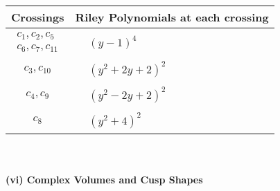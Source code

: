 \documentclass[1p]{elsarticle_modified}
\theoremstyle{definition}
\begin{document}
\begin{tabular}{m{50pt}|m{274pt}}
Crossings & \hspace{64pt}Riley Polynomials at each crossing \\
\hline $$\begin{aligned}c_{1},c_{2},c_{5}\\c_{6},c_{7},c_{11}\end{aligned}$$&$\begin{aligned}
&(y-1)^4
\end{aligned}$\\
\hline $$\begin{aligned}c_{3},c_{10}\end{aligned}$$&$\begin{aligned}
&(y^2+2 y+2)^2
\end{aligned}$\\
\hline $$\begin{aligned}c_{4},c_{9}\end{aligned}$$&$\begin{aligned}
&(y^2-2 y+2)^2
\end{aligned}$\\
\hline $$\begin{aligned}c_{8}\end{aligned}$$&$\begin{aligned}
&(y^2+4)^2
\end{aligned}$\\
\hline
\end{tabular}\\~\\
\newpage\flushleft \textbf{(vi) Complex Volumes and Cusp Shapes}
\end{document}
